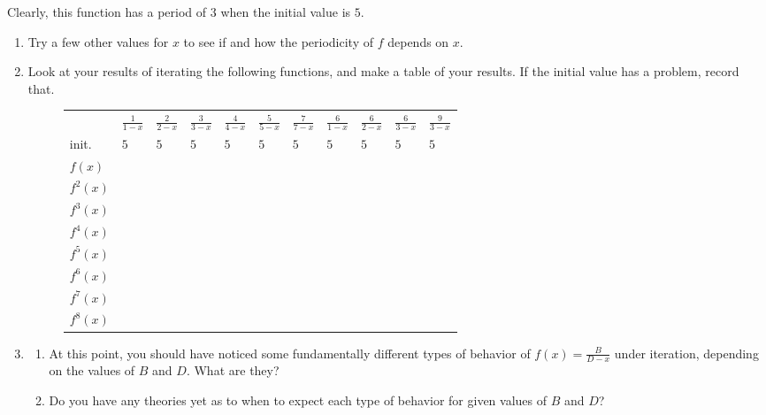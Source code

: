 \documentclass[../textbook.tex]{subfiles}
\begin{document}
\noindent Clearly, this function has a period of $3$ when the initial value is $5$.
\begin{enumerate}
\setcounter{enumi}{\value{problem_i}}
\item Try a few other values for $x$ to see if and how the periodicity of $f$ depends on $x$.
\item Look at your results of iterating the following functions, and make a table of your results. If the initial value has a problem, record that.

\begin{figure}[h]
	\begin{center}
		\begin{minipage}[b]{\textwidth}
			\centering
			\renewcommand*{\arraystretch}{1.25}
			\begin{tabular}{l|llllllllll}
				\hline
				& $\frac{1}{1-x}$ & $\frac{2}{2-x}$ & $\frac{3}{3-x}$ & $\frac{4}{4-x}$ & $\frac{5}{5-x}$ & $\frac{7}{7-x}$ & $\frac{6}{1-x}$ & $\frac{6}{2-x}$ & $\frac{6}{3-x}$ & $\frac{9}{3-x}$ \\
				\rowcolor{light-gray}
				init.    & $5$   & $5$   & $5$ & $5$ & $5$ & $5$ & $5$ & $5$ & $5$ & $5$ \\
				$f(x)$   &       &       &   &   &   &   &   &   &   &   \\
				\rowcolor{light-gray}
				$f^2(x)$ &       &       &   &   &   &   &   &   &   &   \\
				$f^3(x)$ &       &       &   &   &   &   &   &   &   &   \\
				\rowcolor{light-gray}
				$f^4(x)$ &       &       &   &   &   &   &   &   &   &   \\
				$f^5(x)$ &       &       &   &   &   &   &   &   &   &   \\
				\rowcolor{light-gray}
				$f^6(x)$ &       &       &   &   &   &   &   &   &   &   \\
				$f^7(x)$ &       &       &   &   &   &   &   &   &   &   \\
				\rowcolor{light-gray}
				$f^8(x)$ &       &       &   &   &   &   &   &   &   &   \\ \hline
			\end{tabular}
			\vspace*{0.5\baselineskip}
		\end{minipage}
	\end{center}
	\vspace*{-2\baselineskip}
\end{figure}

\item \begin{enumerate}
\item At this point, you should have noticed some fundamentally different types of behavior of $f(x)=\frac{B}{D-x}$ under iteration, depending on the values of $B$ and $D$. What are they?
\item Do you have any theories yet as to when to expect each type of behavior for given values of $B$ and $D$?
\end{enumerate}
\setcounter{problem_i}{\value{enumi}}
\end{enumerate}
\end{document}
